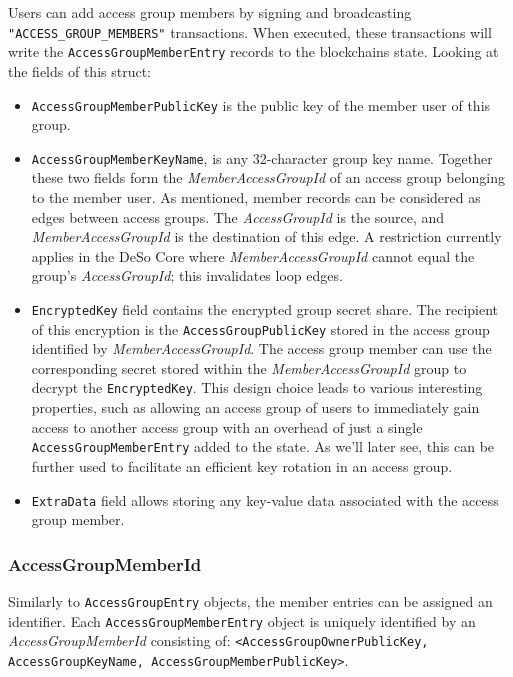 \documentclass[oneside, 12pt]{article}
\newcommand{\ctexttt}[1]{\colorbox{cverbbg}{\texttt{#1}}}
\begin{document}
Users can add access group members by signing and broadcasting \texttt{"ACCESS\_GROUP\_MEMBERS"} transactions. When executed, these transactions will write the \texttt{AccessGroupMemberEntry} records to the blockchains state. Looking at the fields of this struct:

\begin{itemize}
  \item \texttt{AccessGroupMemberPublicKey} is the public key of the member user of this group.
  \item \texttt{AccessGroupMemberKeyName}, is any 32-character group key name. Together these two fields form the \textit{MemberAccessGroupId} of an access group belonging to the member user. As mentioned, member records can be considered as edges between access groups. The \textit{AccessGroupId} is the source, and \textit{MemberAccessGroupId} is the destination of this edge. A restriction currently applies in the DeSo Core where \textit{MemberAccessGroupId} cannot equal the group’s \textit{AccessGroupId}; this invalidates loop edges.
  \item \texttt{EncryptedKey} field contains the encrypted group secret share. The recipient of this encryption is the \texttt{AccessGroupPublicKey} stored in the access group identified by \textit{MemberAccessGroupId}. The access group member can use the corresponding secret stored within the \textit{MemberAccessGroupId} group to decrypt the \texttt{EncryptedKey}. This design choice leads to various interesting properties, such as allowing an access group of users to immediately gain access to another access group with an overhead of just a single \texttt{AccessGroupMemberEntry} added to the state. As we’ll later see, this can be further used to facilitate an efficient key rotation in an access group.
  \item \texttt{ExtraData} field allows storing any key-value data associated with the access group member.
\end{itemize}

\subsubsection{AccessGroupMemberId}
Similarly to \texttt{AccessGroupEntry} objects, the member entries can be assigned an identifier. Each \texttt{AccessGroupMemberEntry} object is uniquely identified by an \textit{AccessGroupMemberId} consisting of:
\newline\ctexttt{<AccessGroupOwnerPublicKey, AccessGroupKeyName, AccessGroupMemberPublicKey>}.
\end{document}
